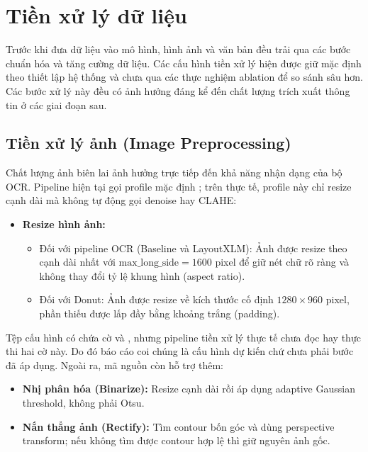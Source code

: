 
\section{Tiền xử lý dữ liệu}
\label{sec:preprocessing}

Trước khi đưa dữ liệu vào mô hình, hình ảnh và văn bản đều trải qua các bước chuẩn hóa và tăng cường dữ liệu. Các cấu hình tiền xử lý hiện được giữ mặc định theo thiết lập hệ thống và chưa qua các thực nghiệm ablation để so sánh sâu hơn. Các bước xử lý này đều có ảnh hưởng đáng kể đến chất lượng trích xuất thông tin ở các giai đoạn sau.

\subsection{Tiền xử lý ảnh (Image Preprocessing)}
\label{subsec:image-preprocessing}

Chất lượng ảnh biên lai ảnh hưởng trực tiếp đến khả năng nhận dạng của bộ OCR. Pipeline hiện tại gọi profile mặc định ; trên thực tế, profile này chỉ resize cạnh dài mà không tự động gọi denoise hay CLAHE:
\begin{itemize}
  \item \textbf{Resize hình ảnh:} 
  \begin{itemize}
    \item Đối với pipeline OCR (Baseline và LayoutXLM): Ảnh được resize theo cạnh dài nhất với $\text{max\_long\_side} = 1600$ pixel để giữ nét chữ rõ ràng và không thay đổi tỷ lệ khung hình (aspect ratio).
    \item Đối với Donut: Ảnh được resize về kích thước cố định $1280 \times 960$ pixel, phần thiếu được lấp đầy bằng khoảng trắng (padding).
  \end{itemize}
\end{itemize}

Tệp cấu hình có chứa cờ  và , nhưng pipeline tiền xử lý thực tế chưa đọc hay thực thi hai cờ này. Do đó báo cáo coi chúng là cấu hình dự kiến chứ chưa phải bước đã áp dụng. Ngoài ra, mã nguồn còn hỗ trợ thêm:
\begin{itemize}
  \item \textbf{Nhị phân hóa (Binarize):} Resize cạnh dài rồi áp dụng adaptive Gaussian threshold, không phải Otsu.
  \item \textbf{Nắn thẳng ảnh (Rectify):} Tìm contour bốn góc và dùng perspective transform; nếu không tìm được contour hợp lệ thì giữ nguyên ảnh gốc.
\end{itemize}

